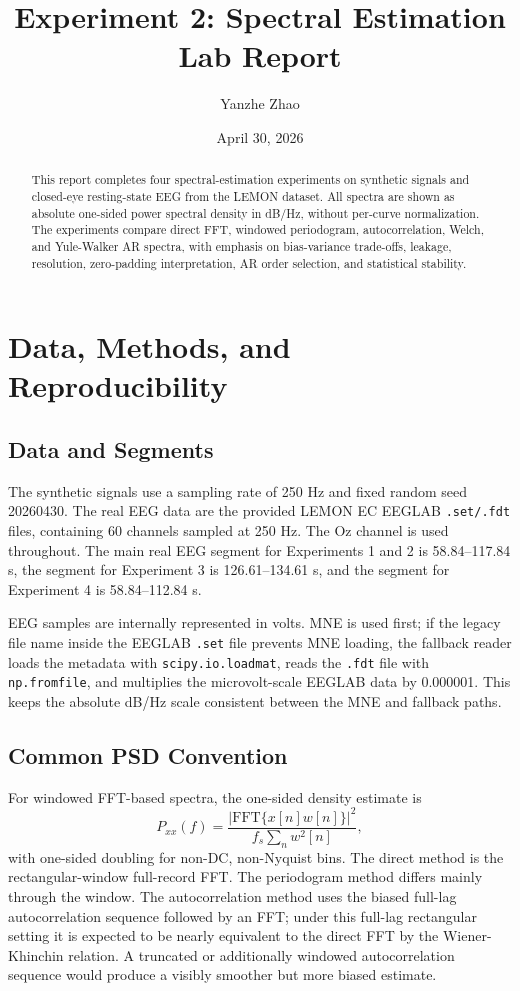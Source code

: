 \documentclass[11pt]{article}
\title{\textbf{Experiment 2: Spectral Estimation Lab Report}}
\author{Yanzhe Zhao}
\date{April 30, 2026}
\begin{document}
\maketitle

\begin{abstract}
This report completes four spectral-estimation experiments on synthetic signals and closed-eye resting-state EEG from the LEMON dataset. All spectra are shown as absolute one-sided power spectral density in dB/Hz, without per-curve normalization. The experiments compare direct FFT, windowed periodogram, autocorrelation, Welch, and Yule-Walker AR spectra, with emphasis on bias-variance trade-offs, leakage, resolution, zero-padding interpretation, AR order selection, and statistical stability.
\end{abstract}

\section{Data, Methods, and Reproducibility}

\subsection{Data and Segments}
The synthetic signals use a sampling rate of 250 Hz and fixed random seed 20260430. The real EEG data are the provided LEMON EC EEGLAB \texttt{.set/.fdt} files, containing 60 channels sampled at 250 Hz. The Oz channel is used throughout. The main real EEG segment for Experiments 1 and 2 is 58.84--117.84 s, the segment for Experiment 3 is 126.61--134.61 s, and the segment for Experiment 4 is 58.84--112.84 s.

EEG samples are internally represented in volts. MNE is used first; if the legacy file name inside the EEGLAB \texttt{.set} file prevents MNE loading, the fallback reader loads the metadata with \texttt{scipy.io.loadmat}, reads the \texttt{.fdt} file with \texttt{np.fromfile}, and multiplies the microvolt-scale EEGLAB data by 0.000001. This keeps the absolute dB/Hz scale consistent between the MNE and fallback paths.

\subsection{Common PSD Convention}
For windowed FFT-based spectra, the one-sided density estimate is
\[
P_{xx}(f)=\frac{|\mathrm{FFT}\{x[n]w[n]\}|^2}{f_s\sum_n w^2[n]},
\]
with one-sided doubling for non-DC, non-Nyquist bins. The direct method is the rectangular-window full-record FFT. The periodogram method differs mainly through the window. The autocorrelation method uses the biased full-lag autocorrelation sequence followed by an FFT; under this full-lag rectangular setting it is expected to be nearly equivalent to the direct FFT by the Wiener-Khinchin relation. A truncated or additionally windowed autocorrelation sequence would produce a visibly smoother but more biased estimate.
\end{document}
